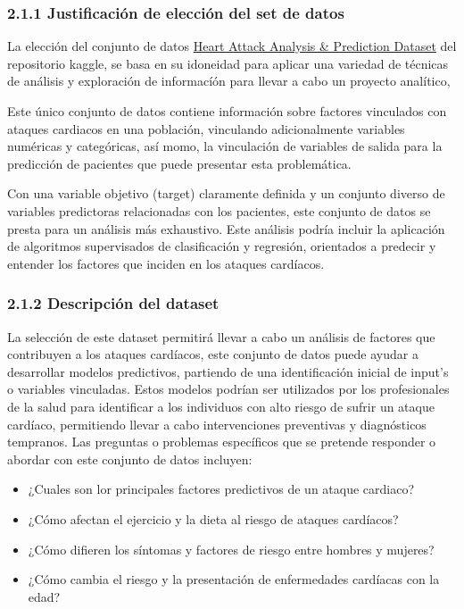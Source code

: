 \documentclass[
]{article}
\providecommand{\tightlist}{%
  \setlength{\itemsep}{0pt}\setlength{\parskip}{0pt}}
\begin{document}
\hypertarget{justificaciuxf3n-de-elecciuxf3n-del-set-de-datos}{%
\subsubsection{2.1.1 Justificación de elección del set de
datos}\label{justificaciuxf3n-de-elecciuxf3n-del-set-de-datos}}

La elección del conjunto de datos
\href{https://www.kaggle.com/datasets/rashikrahmanpritom/heart-attack-analysis-prediction-dataset}{Heart
Attack Analysis \& Prediction Dataset} del repositorio kaggle, se basa
en su idoneidad para aplicar una variedad de técnicas de análisis y
exploración de informacíón para llevar a cabo un proyecto analítico,

Este único conjunto de datos contiene información sobre factores
vinculados con ataques cardiacos en una población, vinculando
adicionalmente variables numéricas y categóricas, así momo, la
vinculación de variables de salida para la predicción de pacientes que
puede presentar esta problemática.

Con una variable objetivo (target) claramente definida y un conjunto
diverso de variables predictoras relacionadas con los pacientes, este
conjunto de datos se presta para un análisis más exhaustivo. Este
análisis podría incluir la aplicación de algoritmos supervisados de
clasificación y regresión, orientados a predecir y entender los factores
que inciden en los ataques cardíacos.

\hypertarget{descripciuxf3n-del-dataset}{%
\subsubsection{2.1.2 Descripción del
dataset}\label{descripciuxf3n-del-dataset}}

La selección de este dataset permitirá llevar a cabo un análisis de
factores que contribuyen a los ataques cardíacos, este conjunto de datos
puede ayudar a desarrollar modelos predictivos, partiendo de una
identificación inicial de input's o variables vinculadas. Estos modelos
podrían ser utilizados por los profesionales de la salud para
identificar a los individuos con alto riesgo de sufrir un ataque
cardíaco, permitiendo llevar a cabo intervenciones preventivas y
diagnósticos tempranos. Las preguntas o problemas específicos que se
pretende responder o abordar con este conjunto de datos incluyen:

\begin{itemize}
\tightlist
\item
  ¿Cuales son lor principales factores predictivos de un ataque
  cardiaco?
\item
  ¿Cómo afectan el ejercicio y la dieta al riesgo de ataques cardíacos?
\item
  ¿Cómo difieren los síntomas y factores de riesgo entre hombres y
  mujeres?
\item
  ¿Cómo cambia el riesgo y la presentación de enfermedades cardíacas con
  la edad?
\end{itemize}
\end{document}
